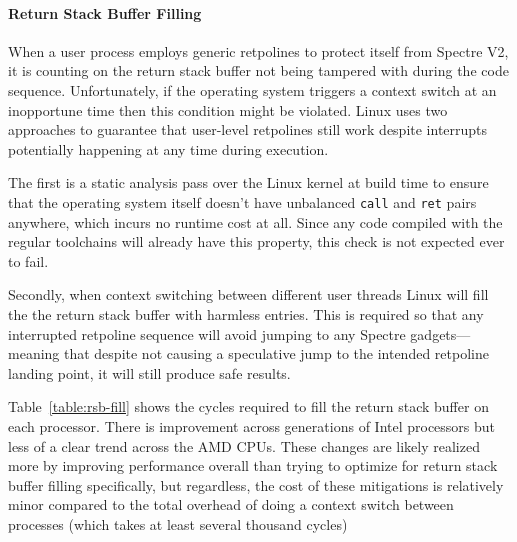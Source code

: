 \paragraph{Return Stack Buffer Filling}

When a user process employs generic retpolines to protect itself from Spectre V2, it is counting on the return stack buffer not being tampered with during the code sequence.
Unfortunately, if the operating system triggers a context switch at an inopportune time then this condition might be violated.
Linux uses two approaches to guarantee that user-level retpolines still work despite interrupts potentially happening at any time during execution.

The first is a static analysis pass over the Linux kernel at build time to ensure that the operating system itself doesn't have  unbalanced \texttt{call} and \texttt{ret} pairs anywhere, which incurs no runtime cost at all.
Since any code compiled with the regular toolchains will already have this property, this check is not expected ever to fail.

Secondly, when context switching between different user threads Linux will fill the the return stack buffer with harmless entries.
This is required so that any interrupted retpoline sequence will avoid jumping to any Spectre gadgets---meaning that despite not causing a speculative jump to the intended retpoline landing point, it will still produce safe results.

Table~\ref{table:rsb-fill} shows the cycles required to fill the return stack buffer on each processor.
There is improvement across generations of Intel processors but less of a clear trend across the AMD CPUs.
These changes are likely realized more by improving performance overall
than trying to optimize for return stack buffer filling specifically, but regardless, the cost of these mitigations is relatively minor compared to the total overhead of doing a context switch between processes (which takes at least several thousand cycles)


